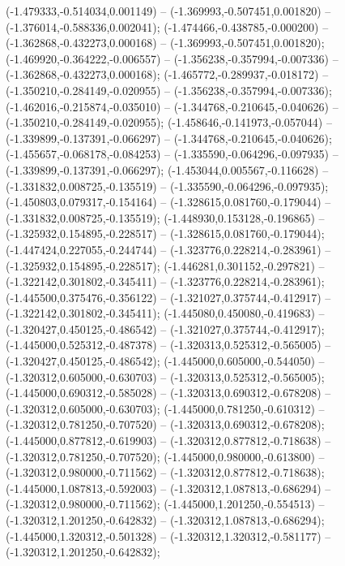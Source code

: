  (-1.479333,-0.514034,0.001149) -- (-1.369993,-0.507451,0.001820) -- (-1.376014,-0.588336,0.002041);
 (-1.474466,-0.438785,-0.000200) -- (-1.362868,-0.432273,0.000168) -- (-1.369993,-0.507451,0.001820);
 (-1.469920,-0.364222,-0.006557) -- (-1.356238,-0.357994,-0.007336) -- (-1.362868,-0.432273,0.000168);
 (-1.465772,-0.289937,-0.018172) -- (-1.350210,-0.284149,-0.020955) -- (-1.356238,-0.357994,-0.007336);
 (-1.462016,-0.215874,-0.035010) -- (-1.344768,-0.210645,-0.040626) -- (-1.350210,-0.284149,-0.020955);
 (-1.458646,-0.141973,-0.057044) -- (-1.339899,-0.137391,-0.066297) -- (-1.344768,-0.210645,-0.040626);
 (-1.455657,-0.068178,-0.084253) -- (-1.335590,-0.064296,-0.097935) -- (-1.339899,-0.137391,-0.066297);
 (-1.453044,0.005567,-0.116628) -- (-1.331832,0.008725,-0.135519) -- (-1.335590,-0.064296,-0.097935);
 (-1.450803,0.079317,-0.154164) -- (-1.328615,0.081760,-0.179044) -- (-1.331832,0.008725,-0.135519);
 (-1.448930,0.153128,-0.196865) -- (-1.325932,0.154895,-0.228517) -- (-1.328615,0.081760,-0.179044);
 (-1.447424,0.227055,-0.244744) -- (-1.323776,0.228214,-0.283961) -- (-1.325932,0.154895,-0.228517);
 (-1.446281,0.301152,-0.297821) -- (-1.322142,0.301802,-0.345411) -- (-1.323776,0.228214,-0.283961);
 (-1.445500,0.375476,-0.356122) -- (-1.321027,0.375744,-0.412917) -- (-1.322142,0.301802,-0.345411);
 (-1.445080,0.450080,-0.419683) -- (-1.320427,0.450125,-0.486542) -- (-1.321027,0.375744,-0.412917);
 (-1.445000,0.525312,-0.487378) -- (-1.320313,0.525312,-0.565005) -- (-1.320427,0.450125,-0.486542);
 (-1.445000,0.605000,-0.544050) -- (-1.320312,0.605000,-0.630703) -- (-1.320313,0.525312,-0.565005);
 (-1.445000,0.690312,-0.585028) -- (-1.320313,0.690312,-0.678208) -- (-1.320312,0.605000,-0.630703);
 (-1.445000,0.781250,-0.610312) -- (-1.320312,0.781250,-0.707520) -- (-1.320313,0.690312,-0.678208);
 (-1.445000,0.877812,-0.619903) -- (-1.320312,0.877812,-0.718638) -- (-1.320312,0.781250,-0.707520);
 (-1.445000,0.980000,-0.613800) -- (-1.320312,0.980000,-0.711562) -- (-1.320312,0.877812,-0.718638);
 (-1.445000,1.087813,-0.592003) -- (-1.320312,1.087813,-0.686294) -- (-1.320312,0.980000,-0.711562);
 (-1.445000,1.201250,-0.554513) -- (-1.320312,1.201250,-0.642832) -- (-1.320312,1.087813,-0.686294);
 (-1.445000,1.320312,-0.501328) -- (-1.320312,1.320312,-0.581177) -- (-1.320312,1.201250,-0.642832);
